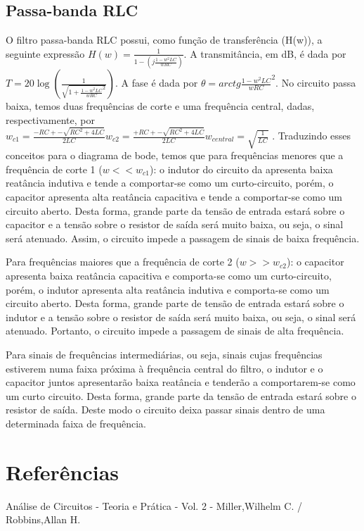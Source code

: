 \documentclass[a4paper]{article}
\begin{document}
\subsection{Passa-banda RLC}

O filtro passa-banda RLC possui, como função de transferência (H(w)), a seguinte expressão $H(w) =\frac{1}{1 -  (j\frac{1 - w^2LC}{wRC})}$. A transmitância, em dB, é dada por $T = 20 \log (\frac{1}{\sqrt{1 + \frac{1 - w^2LC}{wRC}^2}})$. A fase é dada por $\theta = arctg \frac{1 - w^2LC}{wRC}^2 $. No circuito passa baixa, temos duas frequências de corte e uma frequência central, dadas, respectivamente, por  $w_{c1} = \frac{-RC +- \sqrt{RC^2 + 4LC}}{2LC}  w_{c2} = \frac{+RC +- \sqrt{RC^2 + 4LC}}{2LC}  w_{central} = \sqrt{\frac{1}{LC}} $  . 
Traduzindo esses conceitos para o diagrama de bode, temos que para frequências menores que a frequência de corte 1 ($w << w_{c1}$): o indutor do circuito da apresenta baixa reatância indutiva e tende a comportar-se como um curto-circuito, porém, o capacitor apresenta alta reatância capacitiva e tende a comportar-se como um circuito aberto. Desta forma, grande parte da tensão de entrada estará sobre o capacitor e a tensão sobre o resistor de saída será muito baixa, ou seja, o sinal será atenuado. Assim, o circuito impede a passagem de sinais de baixa frequência.

Para frequências maiores que a frequência de corte 2 ($w >> w_{c2}$):  o capacitor apresenta baixa reatância capacitiva e comporta-se como um curto-circuito, porém, o indutor apresenta alta reatância indutiva e comporta-se como um circuito aberto. Desta forma, grande parte de tensão de entrada estará
sobre o indutor e a tensão sobre o resistor de saída será muito baixa, ou seja, o sinal será atenuado. Portanto, o circuito impede a passagem de sinais de alta frequência.  

Para sinais de frequências intermediárias, ou seja, sinais cujas frequências estiverem numa faixa
próxima à frequência central do filtro, o indutor e o capacitor juntos apresentarão
baixa reatância e tenderão a comportarem-se como um curto circuito. Desta forma, grande parte da tensão de entrada estará sobre o resistor de
saída. Deste modo o circuito deixa passar sinais dentro de uma determinada faixa
de frequência. 

\section{Referências}

Análise de Circuitos - Teoria e Prática - Vol. 2 -
Miller,Wilhelm C. / Robbins,Allan H.
        
\end{document}
